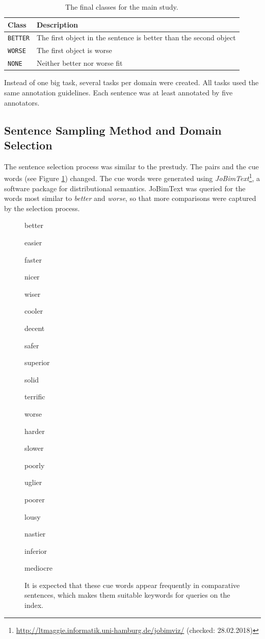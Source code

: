 \begin{table}[h]
\centering
\caption{The final classes for the main study.}
\label{tbl:mainstudy-classes}
\begin{tabular}{@{}ll@{}}
\toprule
Class & Description \\ \midrule
\texttt{BETTER} & The first object in the sentence is better than the second object\\
\texttt{WORSE} & The first object is worse \\
\texttt{NONE} & Neither better nor worse fit\\
\bottomrule
\end{tabular}
\end{table}

Instead of one big task, several tasks per domain were created. All tasks used the same annotation guidelines. Each sentence was at least annotated by five annotators.


\subsection{Sentence Sampling Method and Domain Selection}
The sentence selection process was similar to the prestudy. The pairs and the cue words (see Figure \ref{fig:cue_words}) changed. The cue words were generated using \emph{JoBimText}\footnote{\url{http://ltmaggie.informatik.uni-hamburg.de/jobimviz/} (checked: 28.02.2018)}, a software package for distributional semantics. JoBimText was queried for the words most similar to \emph{better} and \emph{worse}, so that more comparisons were captured by the selection process.

\begin{figure}[hb]
\centering
\caption{It is expected that these cue words appear frequently in comparative sentences, which makes them suitable keywords for queries on the index.}
\label{fig:cue_words}
\begin{multicols}{4}
better

easier

faster

nicer

wiser

cooler

decent

safer

superior

solid

terrific

worse

harder

slower

poorly

uglier

poorer

lousy

nastier

inferior

mediocre
\end{multicols}
\end{figure}

